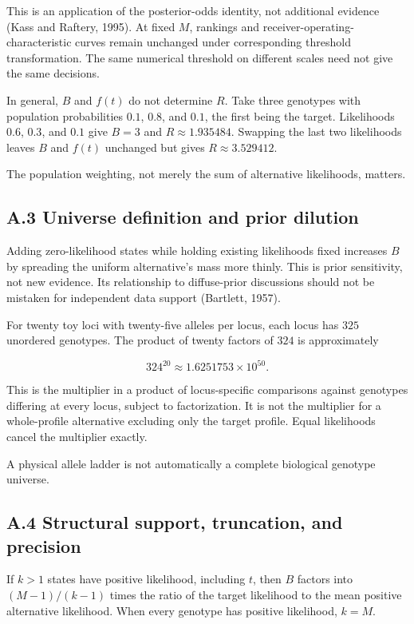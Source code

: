 \documentclass[
]{article}
\begin{document}
This is an application of the posterior-odds identity, not additional
evidence (Kass and Raftery, 1995). At fixed \(M\), rankings and
receiver-operating-characteristic curves remain unchanged under
corresponding threshold transformation. The same numerical threshold on
different scales need not give the same decisions.

In general, \(B\) and \(f(t)\) do not determine \(R\). Take three
genotypes with population probabilities \(0.1\), \(0.8\), and \(0.1\),
the first being the target. Likelihoods \(0.6\), \(0.3\), and \(0.1\)
give \(B=3\) and \(R\approx1.935484\). Swapping the last two likelihoods
leaves \(B\) and \(f(t)\) unchanged but gives \(R\approx3.529412\).

The population weighting, not merely the sum of alternative likelihoods,
matters.

\subsection{A.3 Universe definition and prior
dilution}\label{a.3-universe-definition-and-prior-dilution}

Adding zero-likelihood states while holding existing likelihoods fixed
increases \(B\) by spreading the uniform alternative's mass more thinly.
This is prior sensitivity, not new evidence. Its relationship to
diffuse-prior discussions should not be mistaken for independent data
support (Bartlett, 1957).

For twenty toy loci with twenty-five alleles per locus, each locus has
\(325\) unordered genotypes. The product of twenty factors of \(324\) is
approximately

\[
324^{20}\approx1.6251753\times10^{50}.
\]

This is the multiplier in a product of locus-specific comparisons
against genotypes differing at every locus, subject to factorization. It
is not the multiplier for a whole-profile alternative excluding only the
target profile. Equal likelihoods cancel the multiplier exactly.

A physical allele ladder is not automatically a complete biological
genotype universe.

\subsection{A.4 Structural support, truncation, and
precision}\label{a.4-structural-support-truncation-and-precision}

If \(k>1\) states have positive likelihood, including \(t\), then \(B\)
factors into \((M-1)/(k-1)\) times the ratio of the target likelihood to
the mean positive alternative likelihood. When every genotype has
positive likelihood, \(k=M\).
\end{document}
